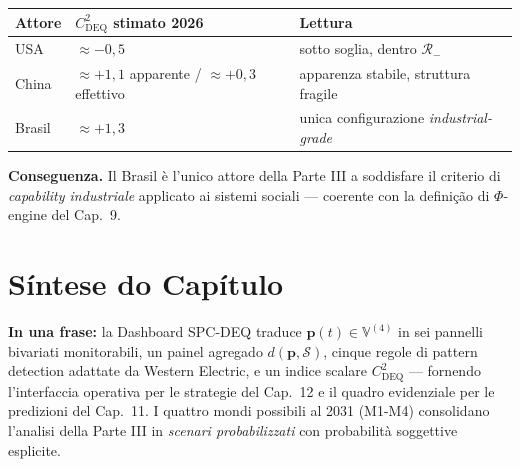{\def\LTcaptype{none} %
{\small\begin{longtable}[]{@{}
  >{\raggedright\arraybackslash}p{}
  >{\raggedright\arraybackslash}p{}
  >{\raggedright\arraybackslash}p{}@{}}
\toprule\noalign{}
\begin{minipage}[b]{\linewidth}\raggedright
Attore
\end{minipage} & \begin{minipage}[b]{\linewidth}\raggedright
\(C_{\text{DEQ}}^2\) stimato 2026
\end{minipage} & \begin{minipage}[b]{\linewidth}\raggedright
Lettura
\end{minipage} \\
\midrule\noalign{}
\endhead
\bottomrule\noalign{}
\endlastfoot
USA & \(\approx -0{,}5\) & sotto soglia, dentro \(\mathcal{R}_-\) \\
China & \(\approx +1{,}1\) apparente / \(\approx +0{,}3\) effettivo &
apparenza stabile, struttura fragile \\
Brasil & \(\approx +1{,}3\) & unica configurazione
\emph{industrial-grade} \\
\end{longtable}}
}

\Hypoth{} \textbf{Conseguenza.} Il Brasil è l'unico attore della Parte
III a soddisfare il criterio di \emph{capability industriale} applicato
ai sistemi sociali --- coerente con la definição di \(\Phi\)-engine
del Cap.~9.



\section{Síntese do Capítulo}\label{sintesi-del-capítulo}

\Proved{} \textbf{In una frase:} la Dashboard SPC-DEQ traduce
\(\boldsymbol{p}(t) \in \mathbb{V}^{(4)}\) in sei pannelli bivariati
monitorabili, un painel agregado \(d(\boldsymbol{p}, \mathcal{S})\),
cinque regole di pattern detection adattate da Western Electric, e un
indice scalare \(C_{\text{DEQ}}^2\) --- fornendo l'interfaccia operativa
per le strategie del Cap.~12 e il quadro evidenziale per le predizioni
del Cap.~11. I quattro mondi possibili al 2031 (M1-M4) consolidano
l'analisi della Parte III in \emph{scenari probabilizzati} con
probabilità soggettive esplicite.


